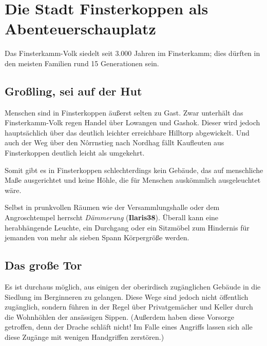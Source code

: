 \documentclass[openright]{Ilaris}
\newcommand{\fkv}{Finsterkamm-Volk }
\begin{document}
\section{Die Stadt Finsterkoppen als Abenteuer\-schauplatz}

Das \fkv siedelt seit 3.000 Jahren im Finsterkamm; dies dürften in den meisten Familien rund 15 Generationen sein.

\subsection{Großling, sei auf der Hut}
Menschen sind in Finsterkoppen äußerst selten zu Gast. Zwar unterhält das \fkv regen Handel über Lowangen und Gashok.
Dieser wird jedoch hauptsächlich über das deutlich leichter erreichbare Hilltorp abgewickelt.
Und auch der Weg über den N\^orrnstieg nach Nordhag fällt Kaufleuten aus Finsterkoppen deutlich leicht als umgekehrt.

Somit gibt es in Finsterkoppen schlechterdings kein Gebäude, das auf menschliche Maße ausgerichtet und keine Höhle, die für Menschen auskömmlich ausgeleuchtet wäre.

Selbst in prunkvollen Räumen wie der Versammlungshalle oder dem Angroschtempel herrscht \emph{Dämmerung} (\textbf{Ilaris38}).
Überall kann eine herabhängende Leuchte, ein Durchgang oder ein Sitzmöbel zum Hindernis für jemanden von mehr als sieben Spann Körpergröße werden.

\subsection{Das große Tor}
Es ist durchaus möglich, aus einigen der oberirdisch zugänglichen Gebäude in die Siedlung im Berginneren zu gelangen.
Diese Wege sind jedoch nicht öffentlich zugänglich, sondern führen in der Regel über Privatgemächer und Keller durch die Wohnhöhlen der ansässigen Sippen. 
(Außerdem haben diese Vorsorge getroffen, denn der Drache schläft nicht! Im Falle eines Angriffs lassen sich alle diese Zugänge mit wenigen Handgriffen zerstören.)
\end{document}
